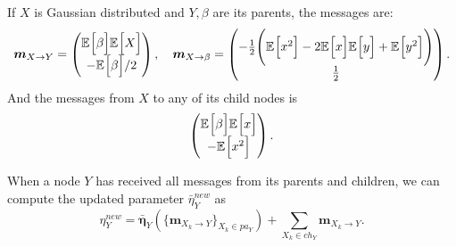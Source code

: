 \begin{exampleth}
     If \( X \) is Gaussian distributed and \( Y, \beta \) are its parents, the messages are:
     \[
           \bm{m}_{X \to Y} = \begin{pmatrix}
                \mathbb{E}_{}\Big[\beta\Big]\mathbb{E}_{}\Big[X\Big]\\
                - \mathbb{E}_{}\Big[\beta\Big]/2
           \end{pmatrix}, \quad
           \bm{m}_{X \to \beta} = \begin{pmatrix}
               -\frac{1}{2}\Bigg( \mathbb{E}_{}\Big[x^2\Big] - 2\mathbb{E}_{}\Big[x\Big]\mathbb{E}_{}\Big[y\Big] + \mathbb{E}_{}\Big[y^2\Big] \Bigg)\\
               \frac{1}{2}
          \end{pmatrix}.
     \]
     And the messages from \( X \) to any of its child nodes is 
     \[
          \begin{pmatrix}
               \mathbb{E}_{}\Big[\beta\Big]\mathbb{E}_{}\Big[x\Big]\\
               - \mathbb{E}_{}\Big[x^2\Big]
          \end{pmatrix}.
     \]
\end{exampleth}

When a node \( Y \) has received all messages from its parents and children, we can compute the updated parameter \( \bar{\eta}^{new}_Y \) as
\[
     \eta^{new}_Y = \bar{\bm{\eta}}_Y(\{ \bm{m}_{X_k \to Y} \}_{X_k \in pa_Y}) + \sum_{X_k \in ch_Y}\bm{m}_{X_k \to Y}.
\] 

\cite{winn2005variational}
